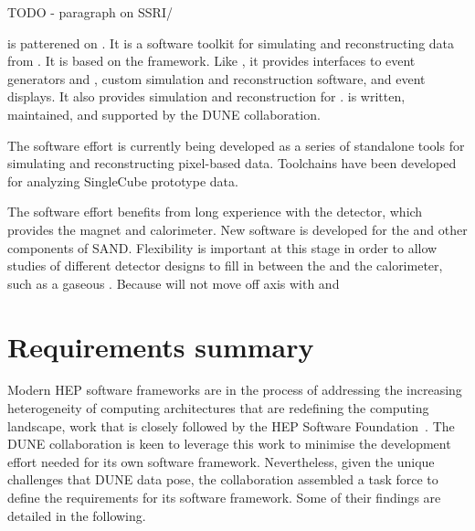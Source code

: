 \documentclass[../main-00.tex]{subfiles}
\begin{document}
TODO - paragraph on SSRI/

 is patterened on .  It is a software toolkit for simulating and reconstructing data from .  It is based on the  framework.  Like , it provides interfaces to event generators and , custom simulation and reconstruction software, and event displays.  It also provides simulation and reconstruction for .   is written, maintained, and supported by the DUNE collaboration.

The  software effort is currently being developed as a series of standalone tools for simulating and reconstructing pixel-based  data.  Toolchains have been developed for analyzing SingleCube prototype data.

The  software effort benefits from long experience with the  detector, which provides the magnet and calorimeter.  New software is developed for the  and other components of SAND.  Flexibility is important at this stage in order to allow studies of different detector designs to fill in between the  and the calorimeter, such as a gaseous .  Because  will not move off axis with  and 

\section{Requirements summary}
Modern HEP software frameworks are in the process of addressing the increasing heterogeneity of computing architectures that are redefining the computing landscape, work that is closely followed by the HEP Software Foundation~\cite{Alves:2017she, Calafiura:2018rwe}. The DUNE collaboration is keen to leverage this work to minimise the development effort needed for its own software framework.  Nevertheless,
given the unique challenges that DUNE data pose, the collaboration assembled a task force to define the requirements for its software framework.  Some of their findings are detailed in the following.
\end{document}
